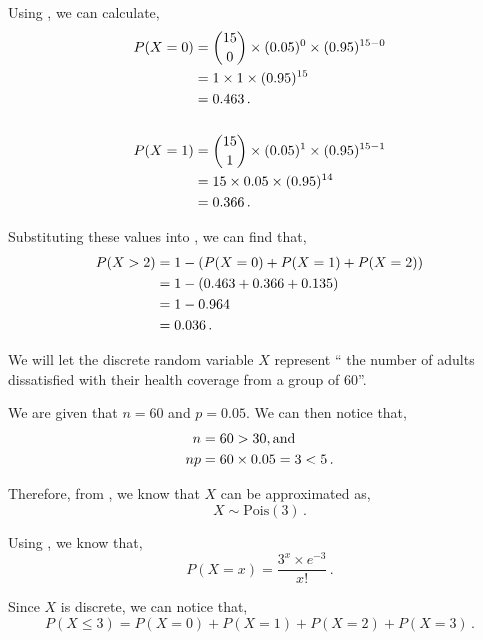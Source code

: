 \begin{subquestions}
\begin{subsubquestions}
\begin{subsubsubquestions}
Using , we can calculate,
\begin{align}
	P(X=0) & = { 15 \choose 0} \times (0.05)^0 \times (0.95)^{15-0} \nonumber \\
	       & = 1 \times 1 \times (0.95)^{15} \nonumber \\
	       & = 0.463 \,. \\ \nonumber \\
	P(X=1) & = { 15 \choose 1} \times (0.05)^1 \times (0.95)^{15-1} \nonumber \\
	       & = 15 \times 0.05 \times (0.95)^{14} \nonumber \\
	       & = 0.366 \,. 
\end{align}

Substituting these values into , we can find that,       
\begin{align}
	P(X>2) & = 1 - (P(X=0)+P(X=1)+P(X=2)) \nonumber \\
	       & = 1 - (0.463+0.366+0.135) \nonumber \\
	       & = 1 - 0.964 \nonumber \\
	       & = 0.036 \,. 
\end{align}

\end{subsubsubquestions}


\subsubquestion

We will let the discrete random variable $X$ represent `` the number of adults dissatisfied with their health coverage from a group of 60''.
 
We are given that $n=60$ and $p=0.05$. We can then notice that,
\begin{align}
	n=60 & >30, \text{and} \nonumber \\
	np = 60 & \times 0.05 = 3 < 5 \,.
\end{align}

Therefore, from , we know that $X$ can be approximated as,
\begin{equation}
	X \sim \text{Pois}(3) \,.
\end{equation}

Using , we know that,
\begin{equation}
	P(X = x) =\frac{ 3 ^ x \times e^{-3}}{x!} \,. \label{2005:q4:Pois1}
\end{equation}

Since $X$ is discrete, we can notice that,
\begin{equation}
	P(X \leq 3) = P(X=0)+P(X=1)+P(X=2)+P(X=3) \,. \label{2005:q4:DisPois}
\end{equation}


\end{subsubquestions}
\end{subquestions}
